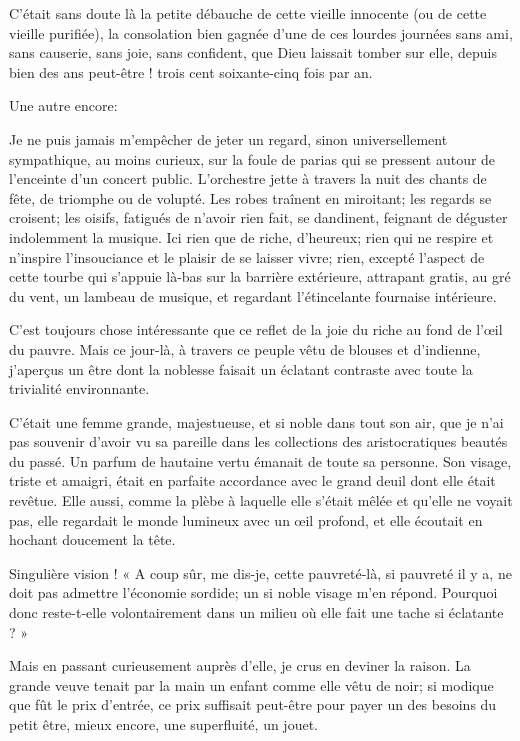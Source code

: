 C’était sans doute là la petite débauche de cette
vieille innocente (ou de cette vieille purifiée), la consolation bien
gagnée d’une de ces lourdes journées sans ami, sans
causerie, sans joie, sans confident, que Dieu laissait tomber sur elle,
depuis bien des ans peut{}-être ! trois cent soixante{}-cinq fois par
an.

Une autre encore:

Je ne puis jamais m’empêcher de jeter un regard, sinon
universellement sympathique, au moins curieux, sur la foule de parias
qui se pressent autour de l’enceinte
d’un concert public. L’orchestre
jette à travers la nuit des chants de fête, de triomphe ou de volupté.
Les robes traînent en miroitant; les regards se croisent; les oisifs,
fatigués de n’avoir rien fait, se dandinent, feignant
de déguster indolemment la musique. Ici rien que de riche,
d’heureux; rien qui ne respire et
n’inspire l’insouciance et le plaisir
de se laisser vivre; rien, excepté l’aspect de cette
tourbe qui s’appuie là{}-bas sur la barrière
extérieure, attrapant gratis, au gré du vent, un lambeau de musique, et
regardant l’étincelante fournaise intérieure.

C’est toujours chose intéressante que ce reflet de la
joie du riche au fond de l’\oe il du pauvre. Mais ce
jour{}-là, à travers ce peuple vêtu de blouses et
d’indienne, j’aperçus un être dont la
noblesse faisait un éclatant contraste avec toute la trivialité
environnante.

C’était une femme grande, majestueuse, et si noble dans
tout son air, que je n’ai pas souvenir
d’avoir vu sa pareille dans les collections des
aristocratiques beautés du passé. Un parfum de hautaine vertu émanait
de toute sa personne. Son visage, triste et amaigri, était en parfaite
accordance avec le grand deuil dont elle était revêtue. Elle aussi,
comme la plèbe à laquelle elle s’était mêlée et
qu’elle ne voyait pas, elle regardait le monde
lumineux avec un \oe il profond, et elle écoutait en hochant doucement la
tête.

Singulière vision ! « A coup sûr, me dis{}-je, cette pauvreté{}-là, si
pauvreté il y a, ne doit pas admettre l’économie
sordide; un si noble visage m’en répond. Pourquoi donc
reste{}-t{}-elle volontairement dans un milieu où elle fait une tache
si éclatante ? »

Mais en passant curieusement auprès d’elle, je crus en
deviner la raison. La grande veuve tenait par la main un enfant comme
elle vêtu de noir; si modique que fût le prix
d’entrée, ce prix suffisait peut{}-être pour payer un
des besoins du petit être, mieux encore, une superfluité, un jouet.

